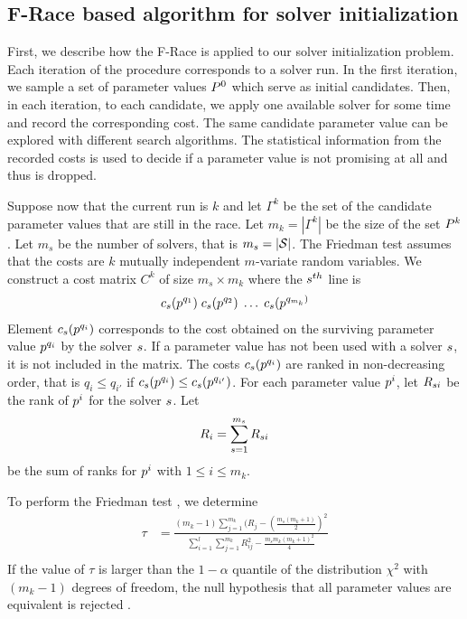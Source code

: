 \subsection{F-Race based algorithm for solver initialization}

First, we describe how the F-Race is applied to our solver initialization problem. Each iteration of the procedure corresponds to a solver run. In the first iteration, we sample a set of parameter values $P^0$ which serve as initial candidates. Then, in each iteration, to each candidate, we apply one available solver for some time and record the corresponding cost. The same candidate parameter value can be explored with different search algorithms. The statistical information from the recorded costs is used to decide if a parameter value is not promising at all and thus is dropped. 

Suppose now that the current run is $k$ and let $\Gamma^k$ be the set of the candidate parameter values that are still in the race. Let $m_k = | \Gamma^k | $ be the size of the set $P^k$. Let $m_s$ be the number of solvers, that is $m_s = | \mathcal{S} |$. The Friedman test assumes that the costs are $k$ mutually independent $m$-variate random variables. We construct a cost matrix $C^k$ of size $m_s \times m_k$ where the $s^{th}$ line is
\begin{eqnarray}\label{eq:C}
c_{s}(p^{q_1})  \; c_{s}(p^{q_2}) \; \ldots  \; c_{s}(p^{q_{m_k})} 
\end{eqnarray}
Element $c_{s}(p^{q_i})$ corresponds to the cost obtained on the surviving parameter value $p^{q_i}$ by the solver $s$. If a parameter value has not been used with a solver $s$, it is not included in the matrix. The costs $c_{s}(p^{q_i})$ are ranked in non-decreasing order, that is $q_i \le q_{i'}$ if $c_{s}(p^{q_i}) \le c_{s}(p^{q_{i'}})$. For each parameter value $p^i$, let $R_{s i}$ be the rank of $p^i$ for the solver $s$. Let $$R_i =  \sum_{s=1}^{m_s} R_{{s} i}$$ 
be the sum of ranks for $p^i$ with $1 \leq i \leq m_k$. 

To perform the Friedman test \cite{FRace2010}, we determine
\begin{eqnarray*}
\tau & = \displaystyle{ \frac{ (m_k-1) \sum_{j=1}^{m_k} (R_j - (\frac{m_s(m_k+1)}{2})^2 } {\sum_{i=1}^l \sum_{j=1}^{m_k}  R^2_{ij} -  \frac{m_s m_k (m_k+1)^2}{4} }} \nonumber \\ 
\end{eqnarray*}
If the value of $\tau$ is larger than the $1 - \alpha$ quantile of the distribution $\chi^2$  with $(m_k - 1)$ degrees of freedom, the null hypothesis that all parameter values are equivalent is rejected \cite{Papoulis1991}. 

